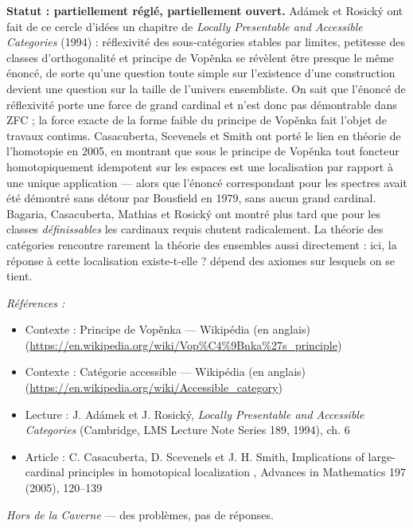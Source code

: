 \documentclass[11pt]{article}
\newenvironment{refs}{\par\small\noindent\emph{Références :}\begin{itemize}\setlength\itemsep{0pt}}{\end{itemize}\normalsize}
\begin{document}
\noindent \textbf{Statut : partiellement réglé, partiellement ouvert.} Adámek et Rosický ont
fait de ce cercle d'idées un chapitre de \textit{Locally Presentable and Accessible Categories}
(1994) : réflexivité des sous-catégories stables par limites, petitesse des classes
d'orthogonalité et principe de Vop\v{e}nka se révèlent être presque le même énoncé, de sorte qu'une
question toute simple sur l'existence d'une construction devient une question sur la taille de
l'univers ensembliste. On sait que l'énoncé de réflexivité porte une force de grand cardinal et
n'est donc pas démontrable dans ZFC ; la force exacte de la forme faible du principe de Vop\v{e}nka
fait l'objet de travaux continus. Casacuberta, Scevenels et Smith ont porté le lien en théorie de
l'homotopie en 2005, en montrant que sous le principe de Vop\v{e}nka tout foncteur homotopiquement
idempotent sur les espaces est une localisation par rapport à une unique application --- alors que
l'énoncé correspondant pour les spectres avait été démontré sans détour par Bousfield en 1979,
sans aucun grand cardinal. Bagaria, Casacuberta, Mathias et Rosický ont montré plus tard que pour
les classes \textit{définissables} les cardinaux requis chutent radicalement. La théorie des
catégories rencontre rarement la théorie des ensembles aussi directement : ici, la réponse à
\og{} cette localisation existe-t-elle ? \fg{} dépend des axiomes sur lesquels on se tient.

\begin{refs}
\item Contexte : Principe de Vop\v{e}nka --- Wikipédia (en anglais) (\url{https://en.wikipedia.org/wiki/Vop%C4%9Bnka%27s_principle})
\item Contexte : Catégorie accessible --- Wikipédia (en anglais) (\url{https://en.wikipedia.org/wiki/Accessible_category})
\item Lecture : J. Adámek et J. Rosický, \textit{Locally Presentable and Accessible Categories} (Cambridge, LMS Lecture Note Series 189, 1994), ch. 6
\item Article : C. Casacuberta, D. Scevenels et J. H. Smith, \og{} Implications of large-cardinal principles in homotopical localization \fg{}, Advances in Mathematics 197 (2005), 120--139
\end{refs}

\bigskip


\vfill
\noindent\emph{Hors de la Caverne} --- des probl\`emes, pas de r\'eponses.
\end{document}

